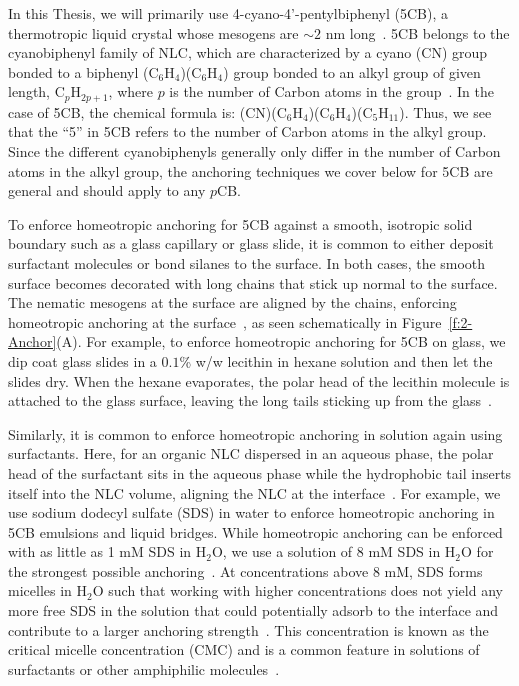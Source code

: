 In this Thesis, we will primarily use 4-cyano-4'-pentylbiphenyl (5CB), a thermotropic liquid crystal whose mesogens are $\sim 2$ nm long~\cite{RN33}.\@
5CB belongs to the cyanobiphenyl family of NLC, which are characterized by a cyano (CN) group  bonded to a biphenyl (C$_6$H$_4$)(C$_6$H$_4$) group bonded to an alkyl group of given length, C$_p$H$_{2p+1}$, where $p$ is the number of Carbon atoms in the group~\cite{RN33}.
In the case of 5CB, the chemical formula is: (CN)(C$_6$H$_4$)(C$_6$H$_4$)(C$_5$H$_{11}$).
Thus, we see that the ``5'' in 5CB refers to the number of Carbon atoms in the alkyl group.
Since the different cyanobiphenyls generally only differ in the number of Carbon atoms in the alkyl group, the anchoring techniques we cover below for 5CB are general and should apply to any $p$CB.

To enforce homeotropic anchoring for 5CB against a smooth, isotropic solid boundary such as a glass capillary or glass slide, it is common to either deposit surfactant molecules or bond silanes to the surface.
In both cases, the smooth surface becomes decorated with long chains that stick up normal to the surface.
The nematic mesogens at the surface are aligned by the chains, enforcing homeotropic anchoring at the surface~\cite{RN33}, as seen schematically in Figure~\ref{f:2-Anchor}(A).
For example, to enforce homeotropic anchoring for 5CB on glass, we dip coat glass slides in a $0.1$\% w/w lecithin in hexane solution and then let the slides dry.
When the hexane evaporates, the polar head of the lecithin molecule is attached to the glass surface, leaving the long tails sticking up from the glass~\cite{RN140}.

Similarly, it is common to enforce homeotropic anchoring in solution again using surfactants.
Here, for an organic NLC dispersed in an aqueous phase, the polar head of the surfactant sits in the aqueous phase while the hydrophobic tail inserts itself into the NLC volume, aligning the NLC at the interface~\cite{RN150,RN235}.
For example, we use sodium dodecyl sulfate (SDS) in water to enforce homeotropic anchoring in 5CB emulsions and liquid bridges.
While homeotropic anchoring can be enforced with as little as 1 mM SDS in H$_2$O, we use a solution of 8 mM SDS in H$_2$O for the strongest possible anchoring~\cite{RN235}.
At concentrations above 8 mM, SDS forms micelles in H$_2$O such that working with higher concentrations does not yield any more free SDS in the solution that could potentially adsorb to the interface and contribute to a larger anchoring strength~\cite{RN234}.
This concentration is known as the critical micelle concentration (CMC) and is a common feature in solutions of surfactants or other amphiphilic molecules~\cite{RN233,RN234}. \\

